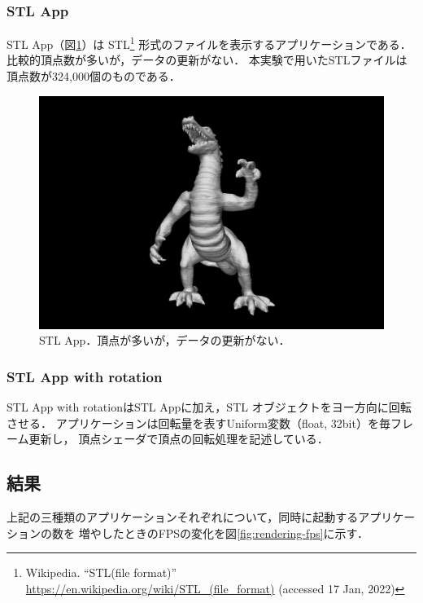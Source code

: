 \subsubsection*{STL App}

STL App（図\ref{fig:stl-app}）は
STL\footnote{Wikipedia. ``STL(file format)'' \url{https://en.wikipedia.org/wiki/STL_(file_format)} (accessed 17 Jan, 2022)}
形式のファイルを表示するアプリケーションである．
比較的頂点数が多いが，データの更新がない．
本実験で用いたSTLファイルは頂点数が324,000個のものである．

\begin{figure}[htbp]
  \centering
  \includegraphics[keepaspectratio, width=0.6\linewidth]{figures/dragon-app.png}
  \caption{
    STL App．頂点が多いが，データの更新がない．
  }
  \label{fig:stl-app}
\end{figure}

\subsubsection*{STL App with rotation}

STL App with rotationはSTL Appに加え，STL オブジェクトをヨー方向に回転させる．
アプリケーションは回転量を表すUniform変数（float, 32bit）を毎フレーム更新し，
頂点シェーダで頂点の回転処理を記述している．

\subsection{結果}

上記の三種類のアプリケーションそれぞれについて，同時に起動するアプリケーションの数を
増やしたときのFPSの変化を図\ref{fig:rendering-fps}に示す．

